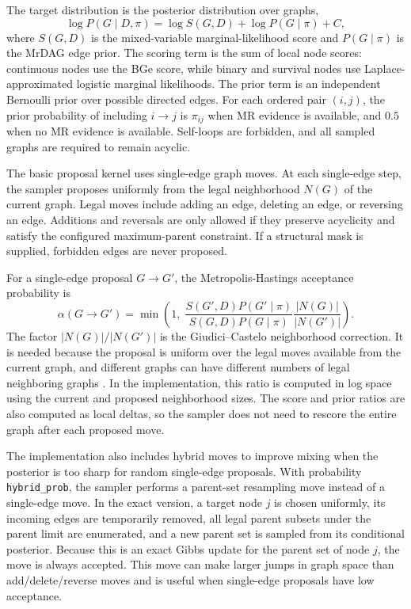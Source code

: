 \documentclass[11pt]{article}
\begin{document}
The target distribution is the posterior distribution over graphs,
\[
\log P(G \mid D, \pi)
=
\log S(G,D) + \log P(G \mid \pi) + C,
\]
where $S(G,D)$ is the mixed-variable marginal-likelihood score and $P(G \mid \pi)$ is the MrDAG edge prior. The scoring term is the sum of local node scores: continuous nodes use the BGe score, while binary and survival nodes use Laplace-approximated logistic marginal likelihoods. The prior term is an independent Bernoulli prior over possible directed edges. For each ordered pair $(i,j)$, the prior probability of including $i \to j$ is $\pi_{ij}$ when MR evidence is available, and $0.5$ when no MR evidence is available. Self-loops are forbidden, and all sampled graphs are required to remain acyclic.

The basic proposal kernel uses single-edge graph moves. At each single-edge step, the sampler proposes uniformly from the legal neighborhood $N(G)$ of the current graph. Legal moves include adding an edge, deleting an edge, or reversing an edge. Additions and reversals are only allowed if they preserve acyclicity and satisfy the configured maximum-parent constraint. If a structural mask is supplied, forbidden edges are never proposed.

For a single-edge proposal $G \to G'$, the Metropolis-Hastings acceptance probability is
\[
\alpha(G \to G')
=
\min\left(
1,\;
\frac{S(G',D)P(G' \mid \pi)}
{S(G,D)P(G \mid \pi)}
\frac{|N(G)|}{|N(G')|}
\right).
\]
The factor $|N(G)|/|N(G')|$ is the Giudici--Castelo neighborhood correction. It is needed because the proposal is uniform over the legal moves available from the current graph, and different graphs can have different numbers of legal neighboring graphs \citep{MadiganYork1995, GiudiciCastelo2003}. In the implementation, this ratio is computed in log space using the current and proposed neighborhood sizes. The score and prior ratios are also computed as local deltas, so the sampler does not need to rescore the entire graph after each proposed move.

The implementation also includes hybrid moves to improve mixing when the posterior is too sharp for random single-edge proposals. With probability \texttt{hybrid\_prob}, the sampler performs a parent-set resampling move instead of a single-edge move. In the exact version, a target node $j$ is chosen uniformly, its incoming edges are temporarily removed, all legal parent subsets under the parent limit are enumerated, and a new parent set is sampled from its conditional posterior. Because this is an exact Gibbs update for the parent set of node $j$, the move is always accepted. This move can make larger jumps in graph space than add/delete/reverse moves and is useful when single-edge proposals have low acceptance.
\end{document}
